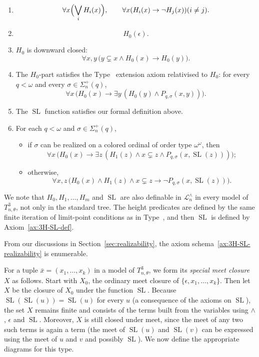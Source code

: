 \documentclass{amsart}
\theoremstyle{definition}
\begin{document}
\begin{enumerate}[label=\textnormal{(C\arabic*)}]
    \item\label{ax:3H-partition}
        $$\forall x\Bigl(\bigvee_{i}H_i(x)\Bigr),\qquad \forall x(H_i(x)\to\neg H_j(x))(i\neq j).$$
    \item\label{ax:3H-root}
        $$H_0(\epsilon).$$
    \item\label{ax:3H-downward}
        \(H_0\) is downward closed:
        $$\forall x,y\,\bigl(y\subsetneq x \land H_0(x)\to H_0(y)\bigr).$$
    \item\label{ax:3H-low}
        The \(H_0\)-part satisfies the Type~\MakeUppercase{} extension axiom relativised to \(H_0\): for every \(q<\omega\) and every \(\sigma\in\Sigma_n^{+}(q)\),
        $$\forall x\,\bigl(H_0(x)\to\exists y\,(H_0(y)\land P_{q,\sigma}(x,y))\bigr).$$
    \item\label{ax:3H-SL-def}
        The $\operatorname{SL}$ function satisfies our formal definition above.
    \item\label{ax:3H-SL-realizability}
        For each \(q<\omega\) and \(\sigma\in\Sigma_n^{+}(q)\),
        \begin{itemize}
            \item if \(\sigma\) can be realized on a colored ordinal of order type \(\omega^\omega\), then
            $$\forall x\,\bigl(H_0(x)\to\exists z\,(H_1(z)\land x\subsetneq z\land P_{q,\sigma}(x,\operatorname{SL}(z)))\bigr);$$
            \item otherwise,
            $$\forall x,z\,\bigl(H_0(x)\land H_1(z)\land x\subsetneq z\to\neg P_{q,\sigma}(x,\operatorname{SL}(z))\bigr).$$
        \end{itemize}
\end{enumerate}

We note that $H_0,H_1,\dots,H_m$ and $\operatorname{SL}$ are also definable in $\mathcal L_n^\wedge$ in every model of $T_{n,\theta}^3$, not only in the standard tree. The height predicates are defined by the same finite iteration of limit-point conditions as in Type~\MakeUppercase{}, and then $\operatorname{SL}$ is defined by Axiom~\ref{ax:3H-SL-def}.


From our discussions in Section~\ref{sec:realizability}, the axiom schema~\ref{ax:3H-SL-realizability} is enumerable.

For a tuple $\bar x=(x_1,\dots,x_k)$ in a model of $T_{n,\theta}^3$, we form its \emph{special meet closure} $X$ as follows. Start with $X_0$, the ordinary meet closure of $\{\epsilon, x_1,\dots,x_k\}$. Then let $X$ be the closure of $X_0$ under the function $\operatorname{SL}$. Because $\operatorname{SL}(\operatorname{SL}(u))=\operatorname{SL}(u)$ for every $u$ (a consequence of the axioms on $\operatorname{SL}$), the set $X$ remains finite and consists of the terms built from the variables using $\wedge$, $\epsilon$ and $\operatorname{SL}$. Moreover, $X$ is still closed under meet, since the meet of any two such terms is again a term (the meet of $\operatorname{SL}(u)$ and $\operatorname{SL}(v)$ can be expressed using the meet of $u$ and $v$ and possibly $\operatorname{SL}$). We now define the appropriate diagrams for this type.
\end{document}
